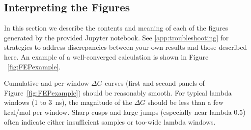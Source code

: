 \documentclass[9pt,tutorial]{Styling/livecoms}
\begin{document}
\subsection{Interpreting the Figures}\label{app:InterpretingFEP}
In this section we describe the contents and meaning of each of the figures generated by the provided Jupyter notebook. See \ref{app:troubleshooting} for strategies to address discrepancies between your own results and those described here. An example of a well-converged calculation is shown in Figure ~\ref{fig:FEPexample}.

Cumulative and per-window $\Delta G$ curves (first and second panels of Figure~\ref{fig:FEPexample}) should be reasonably smooth. For typical lambda windows (1 to 3~ns), the magnitude of the $\Delta G$ should be less than a few kcal/mol per window. Sharp cusps and large jumps (especially near lambda 0.5) often indicate either insufficient samples or too-wide lambda windows.
\end{document}
